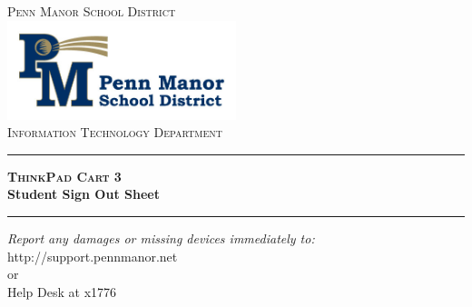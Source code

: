 \begin{titlepage}

\begin{center}

\textsc{\LARGE Penn Manor School District}\\[1.5cm]


\includegraphics[width=0.5\textwidth]{images/logo}\\[1cm]


\textsc{\Large Information Technology Department}\\[0.5cm]


\hrule
{ \huge \bfseries \textsc{ThinkPad Cart} 3\\ \vspace{0.5cm} Student Sign Out Sheet}\\[0.4cm]

\hrule


\vfill
\begin{center} \large
\emph{Report any damages or missing devices immediately to:}\\
http://support.pennmanor.net \\or\\Help Desk at x1776
\end{center}


\vfill

\end{center}

\end{titlepage}
